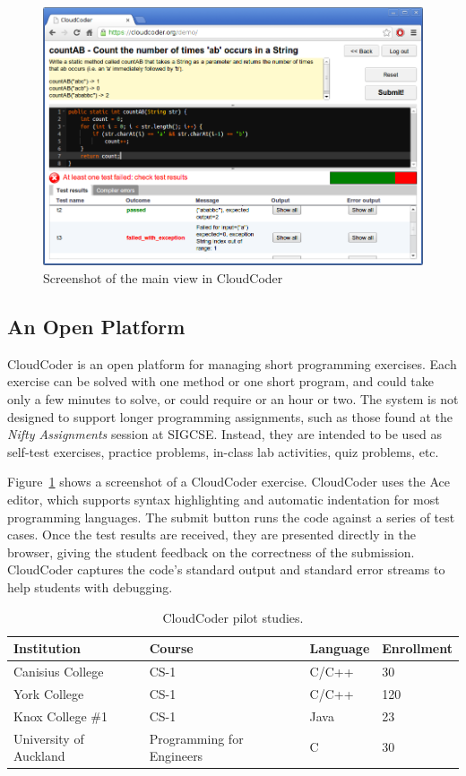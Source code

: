 \documentclass{sig-alternate}
\begin{document}
\begin{figure}
\centering
\includegraphics[width=5.5in]{images/screenshot4}
\caption{Screenshot of the main view in CloudCoder}
\label{screenshot}
\end{figure}


\subsection{An Open Platform}

CloudCoder is an open platform for managing short programming
exercises.
Each exercise can be solved with one method or one short
program, and could take only a few minutes to solve, or could require
or an hour or two.  The system is not designed to support longer
programming assignments, such as those found at the {\em Nifty
Assignments} session at SIGCSE\cite{Parlante:2013:NA:2445196.2445356}.
Instead, they are intended to be used as self-test exercises,
practice problems, in-class lab activities, quiz problems, etc.

Figure~\ref{screenshot} shows a screenshot of a CloudCoder exercise.
CloudCoder uses the Ace editor\cite{ace}, which supports
syntax highlighting and automatic indentation for most programming languages.
The submit button runs the code against a series of
test cases. Once the test results are received, they are presented
directly in the browser, giving the student feedback on the
correctness of the submission.
CloudCoder captures the code's standard output and
standard error streams to help students with debugging.

\begin{table}
\centering
\begin{tabular}{| l | l | l | l |}
\hline
Institution & Course & Language & Enrollment\\
\hline
Canisius College & CS-1 & C/C++ & 30\\
York College & CS-1 & C/C++ & 120\\
Knox College \#1 & CS-1 & Java & 23\\
University of Auckland & Programming for Engineers & C & 30\\
\hline
\end{tabular}
\caption{CloudCoder pilot studies.}
\label{tab:courses}
\end{table}
\end{document}
